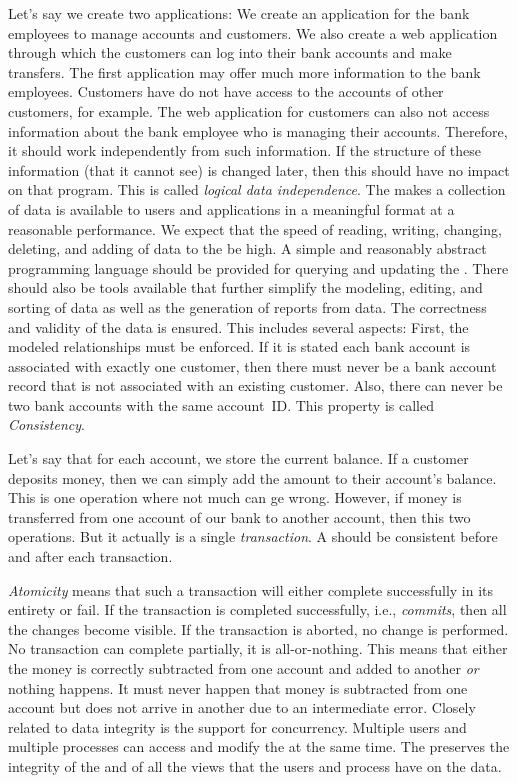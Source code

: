 Let's say we create two applications:
We create an application for the bank employees to manage accounts and customers.
We also create a web application through which the customers can log into their bank accounts and make transfers.
The first application may offer much more information to the bank employees.
Customers have do not have access to the accounts of other customers, for example.
The web application for customers can also not access information about the bank employee who is managing their accounts.
Therefore, it should work independently from such information.
If the structure of these information (that it cannot see) is changed later, then this should have no impact on that program.
This is called \emph{logical data independence}.
\endhsection%
%
The  makes a collection of data is available to users and applications in a meaningful format at a reasonable performance.
We expect that the speed of reading, writing, changing, deleting, and adding of data to the  be high.
A simple and reasonably abstract programming language should be provided for querying and updating the .
There should also be tools available that further simplify the modeling, editing, and sorting of data as well as the generation of reports from data.%
\endhsection%
%
%
The correctness and validity of the data is ensured.
This includes several aspects:
First, the modeled relationships must be enforced.
If it is stated each bank account is associated with exactly one customer, then there must never be a bank account record that is not associated with an existing customer.
Also, there can never be two bank accounts with the same account~ID.
This property is called \emph{Consistency}.

Let's say that for each account, we store the current balance.
If a customer deposits money, then we can simply add the amount to their account's balance.
This is one operation where not much can ge wrong.
However, if money is transferred from one account of our bank to another account, then this  two operations.
But it actually is a single \emph{transaction}.
A  should be consistent before and after each transaction.

\emph{Atomicity} means that such a transaction will either complete successfully in its entirety or fail.
If the transaction is completed successfully, i.e., \emph{commits}, then all the changes become visible.
If the transaction is aborted, no change is performed.
No transaction can complete partially, it is all-or-nothing.
This means that either the money is correctly subtracted from one account and added to another \emph{or} nothing happens.
It must never happen that money is subtracted from one account but does not arrive in another due to an intermediate error.%
\endhsection%
%
%
Closely related to data integrity is the support for concurrency.
Multiple users and multiple processes can access and modify the  at the same time.
The  preserves the integrity of the  and of all the views that the users and process have on the data.

